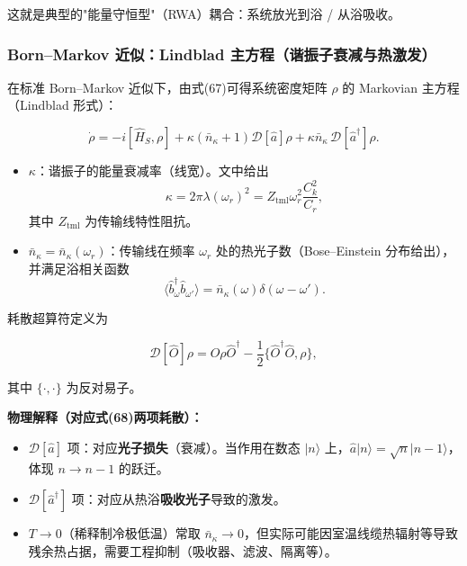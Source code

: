 \documentclass[12pt,a4paper,oneside]{ctexbook}
\begin{document}
这就是典型的"能量守恒型"（RWA）耦合：系统放光到浴 / 从浴吸收。

\subsubsection{Born--Markov 近似：Lindblad 主方程（谐振子衰减与热激发）}

在标准 Born--Markov 近似下，由式(67)可得系统密度矩阵 $\rho$ 的 Markovian 主方程（Lindblad 形式）：

\begin{equation}
\dot\rho=-i[\hat H_S,\rho]+\kappa(\bar n_\kappa+1)\mathcal D[\hat a]\rho
+\kappa\bar n_\kappa\,\mathcal D[\hat a^\dagger]\rho.
\tag{68}
\end{equation}

\begin{itemize}
  \item $\kappa$：谐振子的能量衰减率（线宽）。文中给出
  \begin{equation}
  \kappa=2\pi\lambda(\omega_r)^2
  = Z_{\mathrm{tml}}\omega_r^2\frac{C_k^2}{C_r},
  \end{equation}
  其中 $Z_{\mathrm{tml}}$ 为传输线特性阻抗。
  \item $\bar n_\kappa=\bar n_\kappa(\omega_r)$：传输线在频率 $\omega_r$ 处的热光子数（Bose--Einstein 分布给出），并满足浴相关函数
  \begin{equation}
  \langle \hat b_\omega^\dagger \hat b_{\omega'}\rangle=\bar n_\kappa(\omega)\delta(\omega-\omega').
  \end{equation}
\end{itemize}

耗散超算符定义为

\begin{equation}
\mathcal D[\hat O]\rho=\hat O\rho\hat O^\dagger-\frac12\{\hat O^\dagger\hat O,\rho\},
\tag{69}
\end{equation}

其中 $\{\cdot,\cdot\}$ 为反对易子。

\textbf{物理解释（对应式(68)两项耗散）：}
\begin{itemize}
  \item $\mathcal D[\hat a]$ 项：对应\textbf{光子损失}（衰减）。当作用在数态 $\lvert n\rangle$ 上，$\hat a\lvert n\rangle=\sqrt n\lvert n-1\rangle$，体现 $n\to n-1$ 的跃迁。
  \item $\mathcal D[\hat a^\dagger]$ 项：对应从热浴\textbf{吸收光子}导致的激发。
  \item $T\to 0$（稀释制冷极低温）常取 $\bar n_\kappa\to 0$，但实际可能因室温线缆热辐射等导致残余热占据，需要工程抑制（吸收器、滤波、隔离等）。
\end{itemize}
\end{document}
